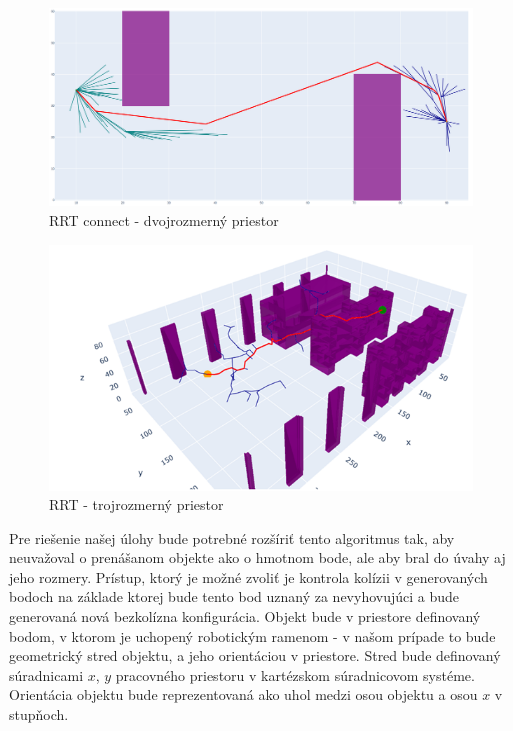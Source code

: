 \begin{figure}[]
	\centering
	\includegraphics[width=140mm]{img/RRTconnect-2D.png}
	\caption{RRT connect - dvojrozmerný priestor} \label{OBRAZOK 3.3} 
\end{figure} 

\begin{figure}[]
	\centering
	\includegraphics[width=140mm]{img/RRT-3D.png}
	\caption{RRT - trojrozmerný priestor} \label{OBRAZOK 3.4} 
\end{figure} 

Pre riešenie našej úlohy bude potrebné rozšíriť tento algoritmus tak, aby neuvažoval o prenášanom objekte ako o hmotnom bode, ale aby bral do úvahy aj jeho rozmery. Prístup, ktorý je možné zvoliť je kontrola kolízii v generovaných bodoch na základe ktorej bude tento bod uznaný za nevyhovujúci a bude generovaná nová bezkolízna konfigurácia. Objekt bude v priestore definovaný bodom, v ktorom je uchopený robotickým ramenom - v našom prípade to bude geometrický stred objektu, a jeho orientáciou v priestore.  Stred bude definovaný súradnicami $ x $, $ y $ pracovného priestoru v kartézskom súradnicovom systéme. Orientácia objektu bude reprezentovaná ako uhol medzi osou objektu a osou  $x$ v stupňoch.

